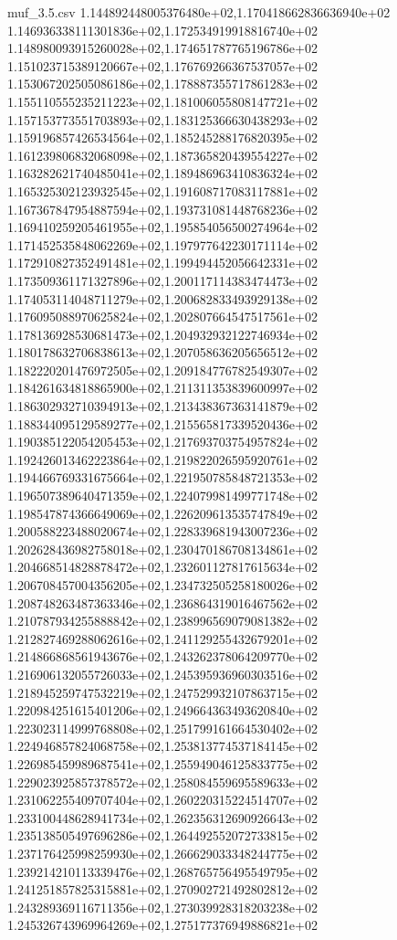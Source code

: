 \begin{filecontents*}{muf_3.5.csv}
1.144892448005376480e+02,1.170418662836636940e+02
1.146936338111301836e+02,1.172534919918816740e+02
1.148980093915260028e+02,1.174651787765196786e+02
1.151023715389120667e+02,1.176769266367537057e+02
1.153067202505086186e+02,1.178887355717861283e+02
1.155110555235211223e+02,1.181006055808147721e+02
1.157153773551703893e+02,1.183125366630438293e+02
1.159196857426534564e+02,1.185245288176820395e+02
1.161239806832068098e+02,1.187365820439554227e+02
1.163282621740485041e+02,1.189486963410836324e+02
1.165325302123932545e+02,1.191608717083117881e+02
1.167367847954887594e+02,1.193731081448768236e+02
1.169410259205461955e+02,1.195854056500274964e+02
1.171452535848062269e+02,1.197977642230171114e+02
1.172910827352491481e+02,1.199494452056642331e+02
1.173509361171327896e+02,1.200117114383474473e+02
1.174053114048711279e+02,1.200682833493929138e+02
1.176095088970625824e+02,1.202807664547517561e+02
1.178136928530681473e+02,1.204932932122746934e+02
1.180178632706838613e+02,1.207058636205656512e+02
1.182220201476972505e+02,1.209184776782549307e+02
1.184261634818865900e+02,1.211311353839600997e+02
1.186302932710394913e+02,1.213438367363141879e+02
1.188344095129589277e+02,1.215565817339520436e+02
1.190385122054205453e+02,1.217693703754957824e+02
1.192426013462223864e+02,1.219822026595920761e+02
1.194466769331675664e+02,1.221950785848721353e+02
1.196507389640471359e+02,1.224079981499771748e+02
1.198547874366649069e+02,1.226209613535747849e+02
1.200588223488020674e+02,1.228339681943007236e+02
1.202628436982758018e+02,1.230470186708134861e+02
1.204668514828878472e+02,1.232601127817615634e+02
1.206708457004356205e+02,1.234732505258180026e+02
1.208748263487363346e+02,1.236864319016467562e+02
1.210787934255888842e+02,1.238996569079081382e+02
1.212827469288062616e+02,1.241129255432679201e+02
1.214866868561943676e+02,1.243262378064209770e+02
1.216906132055726033e+02,1.245395936960303516e+02
1.218945259747532219e+02,1.247529932107863715e+02
1.220984251615401206e+02,1.249664363493620840e+02
1.223023114999768808e+02,1.251799161664530402e+02
1.224946857824068758e+02,1.253813774537184145e+02
1.226985459989687541e+02,1.255949046125833775e+02
1.229023925857378572e+02,1.258084559695589633e+02
1.231062255409707404e+02,1.260220315224514707e+02
1.233100448628941734e+02,1.262356312690926643e+02
1.235138505497696286e+02,1.264492552072733815e+02
1.237176425998259930e+02,1.266629033348244775e+02
1.239214210113339476e+02,1.268765756495549795e+02
1.241251857825315881e+02,1.270902721492802812e+02
1.243289369116711356e+02,1.273039928318203238e+02
1.245326743969964269e+02,1.275177376949886821e+02

\end{filecontents*}
